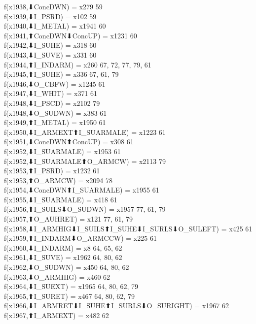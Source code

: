f(x1938,⬇ConcDWN) = x279 {59} \\
f(x1939,⬇I_PSRD) = x102 {59} \\
f(x1940,⬇I_METAL) = x1941 {60} \\
f(x1941,⬆ConcDWN⬇ConcUP) = x1231 {60} \\
f(x1942,⬇I_SUHE) = x318 {60} \\
f(x1943,⬇I_SUVE) = x331 {60} \\
f(x1944,⬆I_INDARM) = x260 {67, 72, 77, 79, 61} \\
f(x1945,⬆I_SUHE) = x336 {67, 61, 79} \\
f(x1946,⬇O_CBFW) = x1245 {61} \\
f(x1947,⬇I_WHIT) = x371 {61} \\
f(x1948,⬇I_PSCD) = x2102 {79} \\
f(x1948,⬇O_SUDWN) = x383 {61} \\
f(x1949,⬆I_METAL) = x1950 {61} \\
f(x1950,⬇I_ARMEXT⬆I_SUARMALE) = x1223 {61} \\
f(x1951,⬇ConcDWN⬆ConcUP) = x308 {61} \\
f(x1952,⬇I_SUARMALE) = x1953 {61} \\
f(x1952,⬇I_SUARMALE⬆O_ARMCW) = x2113 {79} \\
f(x1953,⬆I_PSRD) = x1232 {61} \\
f(x1953,⬆O_ARMCW) = x2094 {78} \\
f(x1954,⬇ConcDWN⬆I_SUARMALE) = x1955 {61} \\
f(x1955,⬇I_SUARMALE) = x418 {61} \\
f(x1956,⬆I_SUILS⬇O_SUDWN) = x1957 {77, 61, 79} \\
f(x1957,⬆O_AUHRET) = x121 {77, 61, 79} \\
f(x1958,⬇I_ARMHIG⬇I_SUILS⬆I_SUHE⬇I_SURLS⬇O_SULEFT) = x425 {61} \\
f(x1959,⬆I_INDARM⬇O_ARMCCW) = x225 {61} \\
f(x1960,⬇I_INDARM) = x8 {64, 65, 62} \\
f(x1961,⬇I_SUVE) = x1962 {64, 80, 62} \\
f(x1962,⬇O_SUDWN) = x450 {64, 80, 62} \\
f(x1963,⬇O_ARMHIG) = x460 {62} \\
f(x1964,⬇I_SUEXT) = x1965 {64, 80, 62, 79} \\
f(x1965,⬆I_SURET) = x467 {64, 80, 62, 79} \\
f(x1966,⬇I_ARMRET⬇I_SUHE⬆I_SURLS⬇O_SURIGHT) = x1967 {62} \\
f(x1967,⬆I_ARMEXT) = x482 {62} \\
